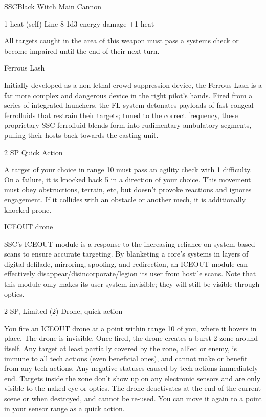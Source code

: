 \begin{mech}{SSC}{Black Witch}
Main Cannon

1 heat (self) 
Line 8 
1d3 energy damage +1 heat

All targets caught in the area of this weapon must pass a systems check or become impaired until the end of their next turn.


Ferrous Lash

Initially developed as a non lethal crowd suppression device, the Ferrous Lash is a far more complex and dangerous device in the right pilot’s hands. Fired from a series of integrated launchers, the FL system detonates payloads of fast-congeal ferrofluids that restrain their targets; tuned to the correct frequency, these proprietary SSC ferrofluid blends form into rudimentary ambulatory segments, pulling their hosts back towards the casting unit. 

2 SP
Quick Action

A target of your choice in range 10 must pass an agility check with 1 difficulty. On a failure, it is knocked back 5 in a direction of your choice. This movement must obey obstructions, terrain, etc, but doesn't provoke reactions and ignores engagement. If it collides with an obstacle or another mech, it is additionally knocked prone. 


ICEOUT drone

SSC’s ICEOUT module is a response to the increasing reliance on system-based scans to ensure accurate targeting. By blanketing a core’s systems in layers of digital defilade, mirroring, spoofing, and redirection, an ICEOUT module can effectively disappear/disincorporate/legion its user from hostile scans. Note that this module only makes its user system-invisible; they will still be visible through optics. 

2 SP, Limited (2)
Drone, quick action

You fire an ICEOUT drone at a point within range 10 of you, where it hovers in place. The drone is invisible. Once fired, the drone creates a burst 2 zone around itself. Any target at least partially covered by the zone, allied or enemy, is immune to all tech actions (even beneficial ones), and cannot make or benefit from any tech actions. Any negative statuses caused by tech actions immediately end. Targets inside the zone don’t show up on any electronic sensors and are only visible to the naked eye or optics. The drone deactivates at the end of the current scene or when destroyed, and cannot be re-used. You can move it again to a point in your sensor range as a quick action.



\end{mech}
